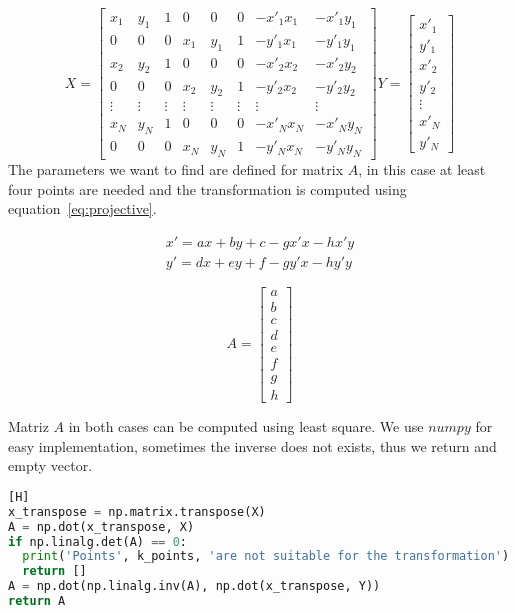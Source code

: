 \begin{itemize}
\[
X = 
\begin{bmatrix}
    x_{1}       & y_{1} & 1 & 0 & 0 & 0 & -x'_1x_1 & -x'_1y_1\\
    0       & 0 & 0 & x_1 & y_1 & 1 & -y'_1x_1 & -y'_1y_1\\
    x_{2}       & y_{2} & 1 & 0 & 0 & 0 & -x'_2x_2 & -x'_2y_2\\
    0       & 0 & 0 & x_2 & y_2 & 1 & -y'_2x_2 & -y'_2y_2 \\
  \vdots & \vdots & \vdots & \vdots & \vdots & \vdots & \vdots & \vdots \\

    x_{N}       & y_{N} & 1 & 0 & 0 & 0 & -x'_Nx_N & -x'_Ny_N\\
    0       & 0 & 0 & x_N & y_N & 1 & -y'_Nx_N & -y'_Ny_N 
\end{bmatrix}
%
Y = 
\begin{bmatrix}
    x'_{1} \\
    y'_{1} \\
    x'_{2}      \\
    y'_{2}   \\
 \vdots \\
    x'_{N}      \\
    y'_{N}   
\end{bmatrix}
\]
The parameters we want to find are defined for matrix $A$, in this case at least four points are needed and the transformation is computed using equation~\ref{eq:projective}.

\begin{equation}
\begin{split}
x'= ax+by+c-gx'x-hx'y\\
y'= dx+ey+f -gy'x-hy'y 
\end{split}
\label{eq:projective}
\end{equation}

\[
A = 
\begin{bmatrix}
    a \\
    b \\
    c      \\
    d   \\ 
    e      \\
    f   \\
    g\\
    h
\end{bmatrix}
\]

Matriz $A$ in both cases can be computed using least square. We use $numpy$ for easy implementation, sometimes the inverse does not exists, thus we return and empty vector.
\begin{lstlisting}[language=python][H]
x_transpose = np.matrix.transpose(X)
A = np.dot(x_transpose, X)
if np.linalg.det(A) == 0:
  print('Points', k_points, 'are not suitable for the transformation')
  return []
A = np.dot(np.linalg.inv(A), np.dot(x_transpose, Y))
return A
\end{lstlisting}


\end{itemize}
